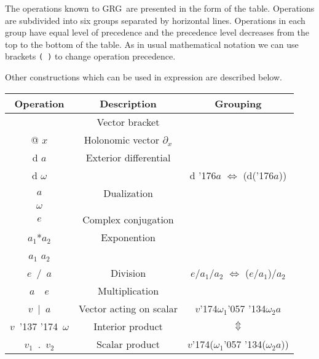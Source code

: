 \documentclass[twoside,openright]{report}
\newcommand{\grgtt}{\ttfamily}
\renewcommand{\tt}{\grgtt}
\def\^{{\tt \char'136}}                     %
\newcommand{\w}{{\tt \char'057 \char'134}}  %
\newcommand{\dd}{{\tt \char'043}}           %
\newcommand{\cc}{{\tt \char'176}}           %
\newcommand{\ip}{{\tt \char'137 \char'174}} %
\newcommand{\ii}{{\tt \char'174}}           %
\newcommand{\grg}{{\sc GRG}}
\begin{document}
The operations known to \grg\ are presented in the form of the table.
Operations are subdivided into six groups separated by horizontal
lines. Operations in each group have equal level of precedence and
the precedence level decreases from the top to the bottom of the table.
As in usual mathematical notation we can use brackets \verb"( )"
to change operation precedence.

Other constructions which can be used in expression are
described below.

\begin{table}
\begin{center}
\begin{tabular}{|c|c|c|}
\hline
{\bf Operation} & {\bf Description} & {\bf Grouping} \\
\hline
{\tt [$v_1$,$v_2$]} & Vector bracket          &                  \\
\hline
{\tt @} $x$         & Holonomic vector $\partial_x$ &            \\
\cline{1-2}
{\tt d} $a$         & Exterior differential   &                  \\
{\tt d} $\omega$    &                         &
          {\tt d} \cc$a$ $\Leftrightarrow$ {\tt (d(}\cc$a${\tt))} \\
\cline{1-2}
{\tt \dd} $a$       & Dualization             &                   \\
{\tt \dd} $\omega$  &                         &                   \\
\cline{1-2}
{\tt \cc} $e$       & Complex conjugation     &                   \\
\hline
$a_1${\tt **}$a_2$  & Exponention             &                   \\
$a_1${\tt\^} $a_2$  &                         &                   \\
\hline
$e$\ {\tt /}\ $a$   & Division                &
          $e${\tt /}$a_1${\tt /}$a_2$ $\Leftrightarrow$
{\tt (}$e${\tt /}$a_1${\tt )/}$a_2$  \\
\hline
$a$\ {\tt *}\ $e$   & Multiplication          &                                   \\
\cline{1-2}
$v$\ {\tt |}\ $a$   & Vector acting on scalar &
$v$\ii$\omega_1$\w$\omega_2${\tt *}$a$ \\
\cline{1-2}
$v$\ \ip\ $\omega$  & Interior product        & $\Updownarrow$  \\
\cline{1-2}
$v_1$\ {\tt.}\ $v_2$& Scalar product          &
$v$\ii{\tt (}$\omega_1$\w{\tt(}$\omega_2${\tt *}$a${\tt ))} \\

\end{tabular}
\end{center}
\end{table}
\end{document}

